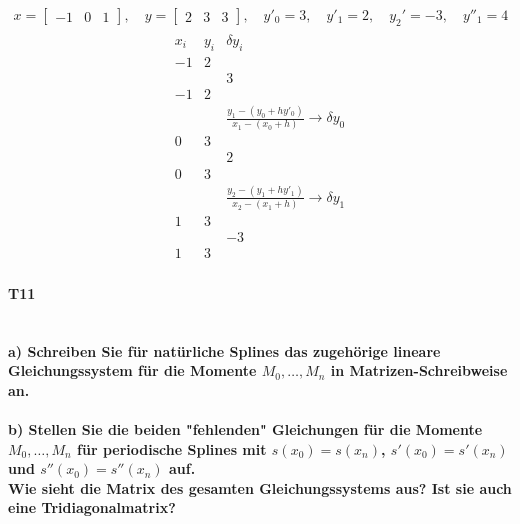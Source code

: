 \documentclass[10pt,a4paper]{article}
\begin{document}
	\begin{align*}
		x = \begin{bmatrix}-1 & 0 & 1\end{bmatrix},\quad y = \begin{bmatrix}2 & 3 & 3\end{bmatrix} ,\quad y'_0 = 3,\quad y'_1 = 2,\quad y_2'=-3,\quad y''_1=4
	\end{align*}
	\begin{align*}
		\begin{array}{ll|c}
			x_i & y_i &                        \delta y_i                        \\ \hline
			-1  & 2   &  \\
			    &     &                            3                             \\
			-1  & 2   &  \\
			    &     & \frac{y_1-(y_0+hy'_0)}{x_1-(x_0+h)}\rightarrow\delta y_0 \\
			0   & 3   &  \\
			    &     &                            2                             \\
			0   & 3   &  \\
			    &     & \frac{y_2-(y_1+hy'_1)}{x_2-(x_1+h)}\rightarrow\delta y_1 \\
			1   & 3   &  \\
			    &     &                            -3                            \\
			1   & 3   &
		\end{array}
	\end{align*}
	
	 
	
	
	
	
	\paragraph{T11}\mbox{}\\
	\textbf{%
		a) Schreiben Sie für natürliche Splines das zugehörige lineare Gleichungssystem für die Momente $M_0, \dots, M_n$ in Matrizen-Schreibweise an.
	}\\ \\
	
	\textbf{%
		b) Stellen Sie die beiden "fehlenden" Gleichungen für die Momente $M_0, \dots, M_n$ für periodische Splines mit $s(x_0) = s(x_n)$, $s′(x_0) = s′(x_n)$ und $s''(x_0)=s''(x_n)$ auf. \\
		Wie sieht die Matrix des gesamten Gleichungssystems aus? Ist sie auch eine Tridiagonalmatrix?
	}
\end{document}
